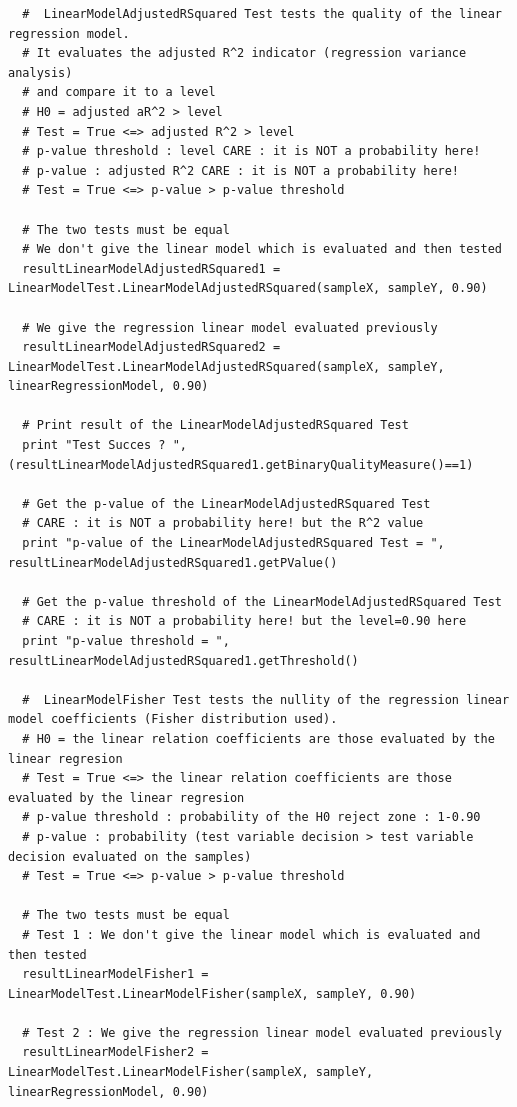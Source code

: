 \begin{lstlisting}
  #  LinearModelAdjustedRSquared Test tests the quality of the linear regression model.
  # It evaluates the adjusted R^2 indicator (regression variance analysis)
  # and compare it to a level
  # H0 = adjusted aR^2 > level
  # Test = True <=> adjusted R^2 > level
  # p-value threshold : level CARE : it is NOT a probability here!
  # p-value : adjusted R^2 CARE : it is NOT a probability here!
  # Test = True <=> p-value > p-value threshold

  # The two tests must be equal
  # We don't give the linear model which is evaluated and then tested
  resultLinearModelAdjustedRSquared1 = LinearModelTest.LinearModelAdjustedRSquared(sampleX, sampleY, 0.90)

  # We give the regression linear model evaluated previously
  resultLinearModelAdjustedRSquared2 = LinearModelTest.LinearModelAdjustedRSquared(sampleX, sampleY, linearRegressionModel, 0.90)

  # Print result of the LinearModelAdjustedRSquared Test
  print "Test Succes ? ", (resultLinearModelAdjustedRSquared1.getBinaryQualityMeasure()==1)

  # Get the p-value of the LinearModelAdjustedRSquared Test
  # CARE : it is NOT a probability here! but the R^2 value
  print "p-value of the LinearModelAdjustedRSquared Test = ", resultLinearModelAdjustedRSquared1.getPValue()

  # Get the p-value threshold of the LinearModelAdjustedRSquared Test
  # CARE : it is NOT a probability here! but the level=0.90 here
  print "p-value threshold = ", resultLinearModelAdjustedRSquared1.getThreshold()

  #  LinearModelFisher Test tests the nullity of the regression linear model coefficients (Fisher distribution used).
  # H0 = the linear relation coefficients are those evaluated by the linear regresion
  # Test = True <=> the linear relation coefficients are those evaluated by the linear regresion
  # p-value threshold : probability of the H0 reject zone : 1-0.90
  # p-value : probability (test variable decision > test variable decision evaluated on the samples)
  # Test = True <=> p-value > p-value threshold

  # The two tests must be equal
  # Test 1 : We don't give the linear model which is evaluated and then tested
  resultLinearModelFisher1 = LinearModelTest.LinearModelFisher(sampleX, sampleY, 0.90)

  # Test 2 : We give the regression linear model evaluated previously
  resultLinearModelFisher2 = LinearModelTest.LinearModelFisher(sampleX, sampleY, linearRegressionModel, 0.90)


\end{lstlisting}
